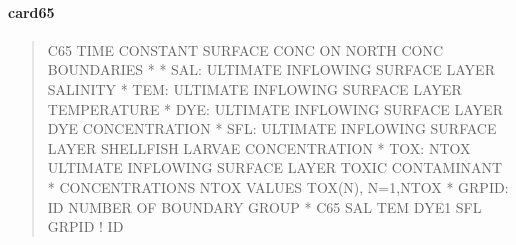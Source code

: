 \documentclass[letterpaper,10pt,english]{sphinxmanual}
\begin{document}
\paragraph{card65}
\label{\detokenize{inputfiles/runcontrol/card65:card65}}\label{\detokenize{inputfiles/runcontrol/card65::doc}}\begin{quote}

\begin{sphinxVerbatim}[commandchars=\\\{\}]
\PYGZhy{}\PYGZhy{}\PYGZhy{}\PYGZhy{}\PYGZhy{}\PYGZhy{}\PYGZhy{}\PYGZhy{}\PYGZhy{}\PYGZhy{}\PYGZhy{}\PYGZhy{}\PYGZhy{}\PYGZhy{}\PYGZhy{}\PYGZhy{}\PYGZhy{}\PYGZhy{}\PYGZhy{}\PYGZhy{}\PYGZhy{}\PYGZhy{}\PYGZhy{}\PYGZhy{}\PYGZhy{}\PYGZhy{}\PYGZhy{}\PYGZhy{}\PYGZhy{}\PYGZhy{}\PYGZhy{}\PYGZhy{}\PYGZhy{}\PYGZhy{}\PYGZhy{}\PYGZhy{}\PYGZhy{}\PYGZhy{}\PYGZhy{}\PYGZhy{}\PYGZhy{}\PYGZhy{}\PYGZhy{}\PYGZhy{}\PYGZhy{}\PYGZhy{}\PYGZhy{}\PYGZhy{}\PYGZhy{}\PYGZhy{}\PYGZhy{}\PYGZhy{}\PYGZhy{}\PYGZhy{}\PYGZhy{}\PYGZhy{}\PYGZhy{}\PYGZhy{}\PYGZhy{}\PYGZhy{}\PYGZhy{}\PYGZhy{}\PYGZhy{}\PYGZhy{}\PYGZhy{}\PYGZhy{}\PYGZhy{}\PYGZhy{}\PYGZhy{}\PYGZhy{}\PYGZhy{}\PYGZhy{}\PYGZhy{}\PYGZhy{}\PYGZhy{}\PYGZhy{}\PYGZhy{}\PYGZhy{}
C65 TIME CONSTANT SURFACE CONC ON NORTH CONC BOUNDARIES
*
*    SAL: ULTIMATE INFLOWING SURFACE LAYER SALINITY
*    TEM: ULTIMATE INFLOWING SURFACE LAYER TEMPERATURE
*    DYE: ULTIMATE INFLOWING SURFACE LAYER DYE CONCENTRATION
*    SFL: ULTIMATE INFLOWING SURFACE LAYER SHELLFISH LARVAE CONCENTRATION
*    TOX: NTOX ULTIMATE INFLOWING SURFACE LAYER TOXIC CONTAMINANT
*         CONCENTRATIONS NTOX VALUES TOX(N), N=1,NTOX
*  GRPID: ID NUMBER OF BOUNDARY GROUP
*
C65       SAL       TEM      DYE1       SFL      GRPID ! ID
\end{sphinxVerbatim}
\end{quote}
\end{document}
